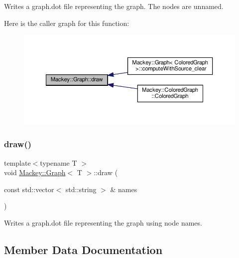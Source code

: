 Writes a graph.\+dot file representing the graph. The nodes are unnamed. 

Here is the caller graph for this function\+:\nopagebreak
\begin{figure}[H]
\begin{center}
\leavevmode
\includegraphics[width=350pt]{classMackey_1_1Graph_ab88d38f2fa1822d415ce7dac272b32dc_icgraph}
\end{center}
\end{figure}
\mbox{\label{classMackey_1_1Graph_a63aa485ca7838f3dc66da1749e09cd84}} 
\subsubsection{\texorpdfstring{draw()}{draw()}\hspace{0.1cm}{\footnotesize\ttfamily [2/2]}}
{\footnotesize\ttfamily template$<$typename T $>$ \\
void \hyperlink{classMackey_1_1Graph}{Mackey\+::\+Graph}$<$ T $>$\+::draw (\begin{DoxyParamCaption}\item[{const std\+::vector$<$ std\+::string $>$ \&}]{names }\end{DoxyParamCaption})}



Writes a graph.\+dot file representing the graph using node names. 



\subsection{Member Data Documentation}
\mbox{\label{classMackey_1_1Graph_a0a2aeb9b16c5f0e583f360943b7f340f}} 
